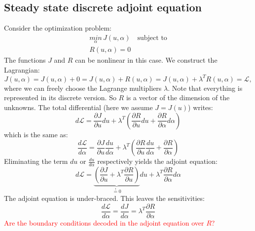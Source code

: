 \documentclass[10pt]{article}
\begin{document}
\subsection{Steady state discrete adjoint equation}
Consider the optimization problem:
\begin{eqnarray}
\underset{\alpha}{min}\,J(u,\alpha)\quad \text{subject to}\\
R(u,\alpha)=0
\end{eqnarray}
The functions $J$ and $R$ can be nonlinear in this case. We construct the Lagrangian:
\begin{equation}
J(u,\alpha) = J(u,\alpha) + 0 = J(u,\alpha) + R(u,\alpha) =  J(u,\alpha) + \lambda^T R(u,\alpha) = \mathcal{L},
\end{equation}
where we can freely choose the Lagrange multipliers $\lambda$. Note that everything is represented in its discrete version. So $R$ is a vector of the dimension of the unknowns. The total differential (here we assume $J = J(u)$) writes:
\begin{equation}
d\mathcal{L} = \frac{\partial J}{\partial u} du + \lambda^T \left( \frac{\partial R}{\partial u} du + \frac{\partial R}{\partial \alpha} d\alpha\right)
\end{equation}
which is the same as:
\begin{equation}
\frac{d\mathcal{L}}{d\alpha} = \frac{\partial J}{\partial u} \frac{du}{d\alpha} + \lambda^T \left( \frac{\partial R}{\partial u} \frac{du}{d\alpha} + \frac{\partial R}{\partial \alpha}\right)
\end{equation}
Eliminating the term $du$ or $\frac{du}{d\alpha}$ respectively yields the adjoint equation:
\begin{equation}
d\mathcal{L} = \underbrace{\left(\frac{\partial J}{\partial u} + \lambda^T  \frac{\partial R}{\partial u} \right)}_{\overset{!}{=} 0} du + \lambda^T \frac{\partial R}{\partial \alpha} d\alpha
\end{equation}
The adjoint equation is under-braced. This leaves the sensitivities:
\begin{equation}
\frac{d\mathcal{L}}{d\alpha} = \frac{dJ}{d\alpha} = \lambda^T \frac{\partial R}{\partial \alpha}
\end{equation}
\textcolor{red}{Are the boundary conditions decoded in the adjoint equation over $R$?}
\end{document}
